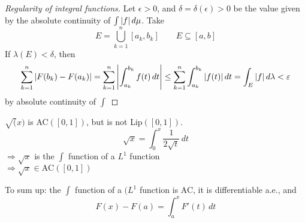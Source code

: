 \begin{proof}[Regularity of integral functions]
    Let \(\epsilon > 0\), and \(\delta = \delta(\epsilon) > 0\) be the value given by the absolute continuity of \(\int \abs{f} \, d\mu\). 
    Take 
    \[
        E = \bigcup_{k=1}^n \left[ a_k, b_k \right] \qquad E \subseteq \left[a, b\right]
    \]
    If \(\lambda(E) < \delta\), then
    \[
        \sum_{k=1}^n \abs{F(b_k) - F(a_k)} = \sum_{k=1}^n \abs{\int_{a_k}^{b_k} f(t)\, dt} 
        \leq \sum_{k=1}^n \int_{a_k}^{b_k} \abs{f(t)}\, dt
        = \int_E \abs{f} \, d\lambda < \varepsilon
    \]
    by absolute continuity of \(\int\) 
\end{proof}
\begin{remark}
    \(\sqrt(x)\) is AC\((\left[0, 1\right])\), but is not Lip\((\left[0, 1\right])\).
    \[
        \sqrt{x} = \int_0^x \frac{1}{2\sqrt{t}} \, dt
    \]
    \(\Rightarrow \sqrt{x}\) is the \(\int\) function of a \(L^1\) function \\
    \(\Rightarrow \sqrt{x} \in \text{AC}(\left[0, 1\right])\)
\end{remark}

To sum up: the \(\int \) function of a \((L^1\) function is AC, it is differentiable a.e., and 
\[
    F(x) - F(a) = \int_a^x F'(t) \, dt \tag*{FC}
\]

